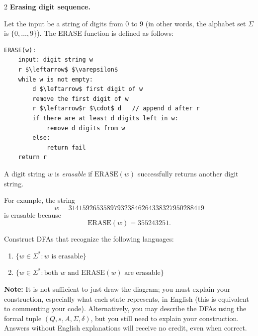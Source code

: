 \documentclass[12pt]{article}
\begin{document}
\begin{problem}{2}
\textbf{Erasing digit sequence.}

Let the input be a string of digits from $0$ to $9$ (in other words, the alphabet set $\Sigma$ is $\{0, \dots, 9\}$). The ERASE function is defined as follows:

\begin{lstlisting}[mathescape]
ERASE(w):
    input: digit string w
    r $\leftarrow$ $\varepsilon$
    while w is not empty:
        d $\leftarrow$ first digit of w
        remove the first digit of w
        r $\leftarrow$r $\cdot$ d   // append d after r
        if there are at least d digits left in w:
            remove d digits from w
        else:
            return fail
    return r
\end{lstlisting}

A digit string $w$ is \emph{erasable} if $\text{ERASE}(w)$ successfully returns another digit string.

For example, the string
\[
w = 314159265358979323846264338327950288419
\]
is erasable because
\[
\text{ERASE}(w) = 355243251.
\]

Construct DFAs that recognize the following languages:

\begin{enumerate}
    \item[(a)] $\{ w \in \Sigma^* : w \text{ is erasable} \}$
    \item[(b)] $\{ w \in \Sigma^* : \text{both } w \text{ and } \text{ERASE}(w) \text{ are erasable} \}$
\end{enumerate}

\textbf{Note:} It is not sufficient to just draw the diagram; you must explain your construction, especially what each state represents, in English (this is equivalent to commenting your code). Alternatively, you may describe the DFAs using the formal tuple $(Q, s, A, \Sigma, \delta)$, but you still need to explain your construction. Answers without English explanations will receive no credit, even when correct.
\end{problem}
\end{document}

